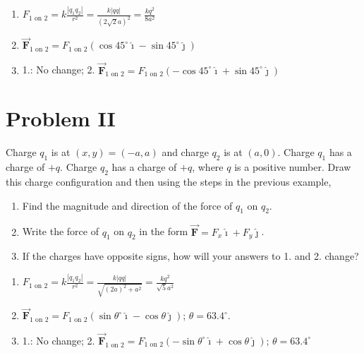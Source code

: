 \documentclass{article}
\renewcommand{\mbox}{\text}
\newcommand{\ds}[0]{\displaystyle}
\newcommand{\ihat}[0]{\hat{\boldsymbol{\imath}}}
\newcommand{\jhat}[0]{\hat{\boldsymbol{\jmath}}}
\newcommand{\bfvec}[1]{\vec{\mathbf{#1}}}
\begin{document}


\ifsolutions

    \begin{enumerate}

      \item $\ds F_{1\mbox{ on } 2}=k\frac{|q_1q_2|}{r^2}=\frac{k|qq|}{(2\sqrt{2}a)^2}=\frac{kq^2}{8a^2}$

      \item $\bfvec{F}_{1\mbox{ on } 2} = F_{1\mbox{ on } 2}(\cos 45^\circ \ihat - \sin 45^\circ \jhat)$

      \item 1.: No change; 2. $\bfvec{F}_{1\mbox{ on } 2} = F_{1\mbox{ on } 2}(-\cos 45^\circ \ihat + \sin 45^\circ \jhat)$

    \end{enumerate}
\fi

\newpage

\section{Problem II}

Charge $q_1$ is at $(x,y)=(-a,a)$ and charge $q_2$ is at $(a, 0)$. Charge $q_1$ has a charge of $+q$. Charge $q_2$ has a charge of $+q$, where $q$ is a positive number. Draw this charge configuration and then using the steps in the previous example,

\begin{enumerate}

  \item Find the magnitude and direction of the force of $q_1$ on $q_2$.

  \item Write the force of $q_1$ on $q_2$ in the form $\bfvec{F}=F_x\ihat + F_y\jhat$.

  \item If the charges have opposite signs, how will your answers to 1. and 2. change?

\end{enumerate}



\ifsolutions



    \begin{enumerate}

      \item $\ds F_{1\mbox{ on } 2}=k\frac{|q_1q_2|}{r^2}=\frac{k|qq|}{\sqrt{(2a)^2+a^2}}=\frac{kq^2}{\sqrt{5}a^2}$

      \item $\bfvec{F}_{1\mbox{ on } 2} = F_{1\mbox{ on } 2}(\sin \theta^\circ \ihat - \cos \theta\jhat)$; $\theta=63.4^\circ$.

      \item 1.: No change; 2. $\bfvec{F}_{1\mbox{ on } 2} = F_{1\mbox{ on } 2}(-\sin \theta^\circ \ihat + \cos \theta\jhat)$; $\theta=63.4^\circ$

    \end{enumerate}
\fi
\end{document}
